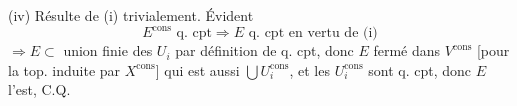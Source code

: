 
(iv) Résulte de (i) trivialement. Évident
\[
E^{\mathrm{cons}}\text{ q. cpt}\Longrightarrow E\text{ q. cpt en vertu de (i)}
\]
$\Longrightarrow E\subset$ union finie  des $U_i$ par définition de q. cpt, donc $E$ fermé dans $V^{\mathrm{cons}}$ [pour la top. induite par $X^{\mathrm{cons}}$] qui est aussi $\bigcup U_i^{\mathrm{cons}}$, et les $U_i^{\mathrm{cons}}$ sont q. cpt, donc $E$ l'est, C.Q.

